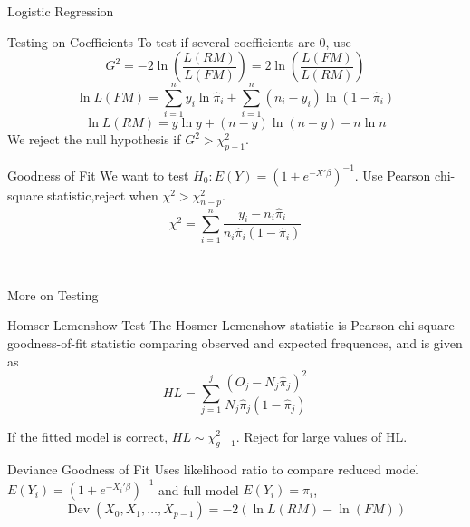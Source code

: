 \documentclass{article}
\DeclareMathOperator{\dev}{Dev}
\begin{document}
\begin{multicols*}{3}
\begin{blackbox}{Logistic Regression}
            \begin{brownbox}{Testing on Coefficients}
                To test if several coefficients are 0, use\\[-2ex]
                \[G^2 = -2\ln \left(\frac{L(RM)}{L(FM)}\right) = 2\ln \left(\frac{L(FM)}{L(RM)}\right)\]
                \vspace{-2ex}
                \[\ln L(FM) =\sum_{i=1}^n y_i\ln \hat{\pi}_i + \sum_{i=1}^n (n_i-y_i)\ln(1-\hat{\pi}_i)\]
                \[\ln L(RM) = y\ln y + (n-y)\ln(n-y) - n\ln n\]
                We reject the null hypothesis if $G^2 > \chi^2_{p-1}$. 
            \end{brownbox}
            \begin{pinkbox}{Goodness of Fit}
                We want to test $H_0: E(Y) = \left(1 + e^{-X'\beta}\right)^{-1}$. Use Pearson chi-square statistic,reject when $\chi^2 > \chi^2_{n-p}$.\\
                \[\chi^2 = \sum_{i=1}^n \frac{y_i-n_i\hat{\pi}_i}{n_i\hat{\pi}_i(1-\hat{\pi}_i)}\]
                
            \end{pinkbox}\\[-2ex]
        \end{blackbox}
        \begin{blackbox}{More on Testing}
            \begin{redbox}{Homser-Lemenshow Test}
                The Hosmer-Lemenshow statistic is Pearson chi-square goodness-of-fit statistic comparing observed and
                expected frequences, and is given as\\[-3ex]
                \[HL = \sum_{j=1}^j \frac{(O_j - N_j\hat{\pi}_j)^2}{N_j\hat{\pi}_j(1-\hat{\pi}_j)}\]
                \vspace{-2ex}

                If the fitted model is correct, $HL \sim \chi^2_{g-1}$. Reject for large values of HL.
            \end{redbox}
            \begin{pinkbox}{Deviance Goodness of Fit}
                Uses likelihood ratio to compare reduced model $E(Y_i) = \left(1 + e^{-X_i'\beta}\right)^{-1}$ and full model $E(Y_i) = \pi_i$, \\[-2ex]
                \[\dev(X_0, X_1, \ldots, X_{p-1}) = -2 (\ln L(RM) - \ln(FM))\]
                \vspace{-3ex}


\end{pinkbox}
\end{blackbox}
\end{multicols*}
\end{document}
